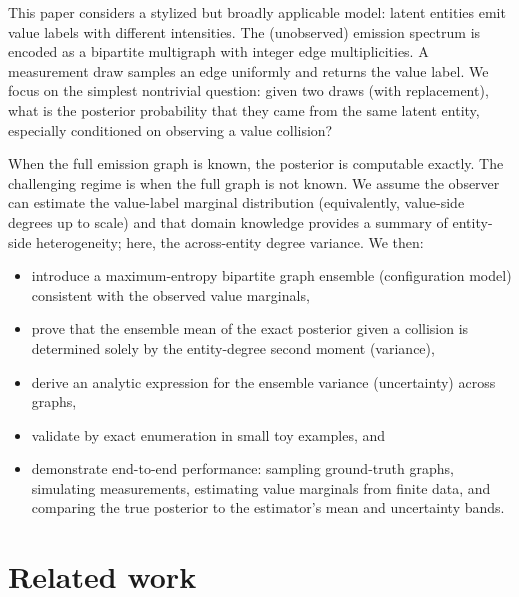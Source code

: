 \documentclass[11pt]{article}
\newcommand{\1}{\mathbf{1}}
\theoremstyle{plain}
\theoremstyle{definition}
\begin{document}
This paper considers a stylized but broadly applicable model: latent entities emit value labels with different intensities.
The (unobserved) emission spectrum is encoded as a bipartite multigraph with integer edge multiplicities.
A measurement draw samples an edge uniformly and returns the value label.
We focus on the simplest nontrivial question: given two draws (with replacement), what is the posterior probability that they came from the same latent entity, especially conditioned on observing a value collision?

When the full emission graph is known, the posterior is computable exactly.
The challenging regime is when the full graph is not known.
We assume the observer can estimate the value-label marginal distribution (equivalently, value-side degrees up to scale) and that domain knowledge provides a summary of entity-side heterogeneity; here, the across-entity degree variance.
We then:
\begin{itemize}[leftmargin=*]
\item introduce a maximum-entropy bipartite graph ensemble (configuration model) consistent with the observed value marginals,
\item prove that the ensemble mean of the exact posterior given a collision is determined solely by the entity-degree second moment (variance),
\item derive an analytic expression for the ensemble variance (uncertainty) across graphs,
\item validate by exact enumeration in small toy examples, and
\item demonstrate end-to-end performance: sampling ground-truth graphs, simulating measurements, estimating value marginals from finite data, and comparing the true posterior to the estimator's mean and uncertainty bands.
\end{itemize}

\section{Related work}
\label{sec:related}
\end{document}
